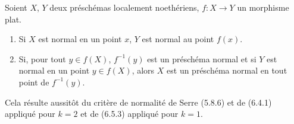 \begin{corollary}[6.5.4]
\label{IV.2.s6.5.4-fr}
Soient $X$, $Y$ deux préschémas localement noethériens, $f:X\to Y$
un morphisme plat.
\begin{enumerate}
\item[(i)] Si $X$ est normal en un point $x$, $Y$ est normal au point
$f(x)$.
\item[(ii)] Si, pour tout $y\in f(X)$, $f^{-1}(y)$ est un préschéma
normal et si $Y$ est normal en un point $y\in f(X)$, alors $X$ est un
préschéma normal en tout point de $f^{-1}(y)$.
\end{enumerate}
\end{corollary}

Cela résulte aussitôt du critère de normalité de Serre (5.8.6) et de
(6.4.1) appliqué pour $k=2$ et de (6.5.3) appliqué pour $k=1$.


